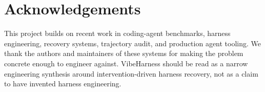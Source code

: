 \documentclass[11pt]{article}
\begin{document}
\section*{Acknowledgements}

This project builds on recent work in coding-agent benchmarks, harness
engineering, recovery systems, trajectory audit, and production agent tooling. We
thank the authors and maintainers of these systems for making the problem
concrete enough to engineer against. VibeHarness should be read as a narrow
engineering synthesis around intervention-driven harness recovery, not as a
claim to have invented harness engineering.



\end{document}
